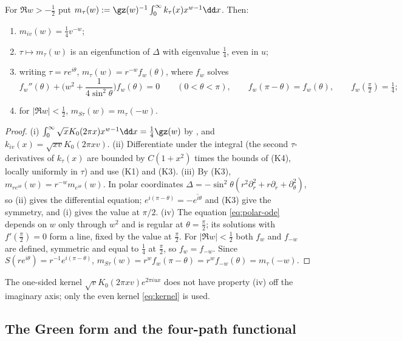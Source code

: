 \begin{lemma}\label{lem:kernel-mellin}
For $\Re w>-\frac12$ put $m_\tau(w):=\gz(w)^{-1}\int_0^\infty k_\tau(x)x^{w-1}\dd x$. Then:
\begin{enumerate}[label=\textup{(\roman*)}]
\item $m_{iv}(w)=\frac14v^{-w}$;
\item $\tau\mapsto m_\tau(w)$ is an eigenfunction of $\Delta$ with eigenvalue $\frac14$, even in $u$;
\item writing $\tau=re^{i\theta}$, $m_\tau(w)=r^{-w}f_w(\theta)$, where $f_w$ solves
\begin{equation}\label{eq:polar-ode}
f_w''(\theta)+\Big(w^2+\frac1{4\sin^2\theta}\Big)f_w(\theta)=0\qquad(0<\theta<\pi),\qquad f_w(\pi-\theta)=f_w(\theta),\qquad f_w(\tfrac\pi2)=\tfrac14 ;
\end{equation}
\item for $|\Re w|<\frac12$, $m_{S\tau}(w)=m_\tau(-w)$.
\end{enumerate}
\end{lemma}

\begin{proof}
(i) $\int_0^\infty\sqrt xK_0(2\pi x)x^{w-1}\dd x=\frac14\gz(w)$ by \cite[10.43.19]{DLMF}, and $k_{iv}(x)=\sqrt{xv}K_0(2\pi xv)$. (ii) Differentiate under
the integral (the second $\tau$-derivatives of $k_\tau(x)$ are bounded by $C(1+x^2)$ times the bounds of (K4), locally uniformly in $\tau$) and use
(K1) and (K3). (iii) By (K3), $m_{re^{i\theta}}(w)=r^{-w}m_{e^{i\theta}}(w)$. In polar coordinates
$\Delta=-\sin^2\theta(r^2\partial_r^2+r\partial_r+\partial_\theta^2)$, so (ii) gives the differential equation; $e^{i(\pi-\theta)}=-\overline{e^{i\theta}}$ and
(K3) give the symmetry, and (i) gives the value at $\pi/2$. (iv) The equation \eqref{eq:polar-ode} depends on $w$ only through $w^2$ and is
regular at $\theta=\frac\pi2$; its solutions with $f'(\frac\pi2)=0$ form a line, fixed by the value at $\frac\pi2$. For $|\Re w|<\frac12$ both
$f_w$ and $f_{-w}$ are defined, symmetric and equal to $\frac14$ at $\frac\pi2$, so $f_w=f_{-w}$. Since $S(re^{i\theta})=r^{-1}e^{i(\pi-\theta)}$,
$m_{S\tau}(w)=r^wf_w(\pi-\theta)=r^wf_{-w}(\theta)=m_\tau(-w)$.
\end{proof}

The one-sided kernel $\sqrt vK_0(2\pi xv)e^{2\pi iux}$ does not have property (iv) off the imaginary axis; only the even kernel \eqref{eq:kernel}
is used.

\subsection{The Green form and the four-path functional}

